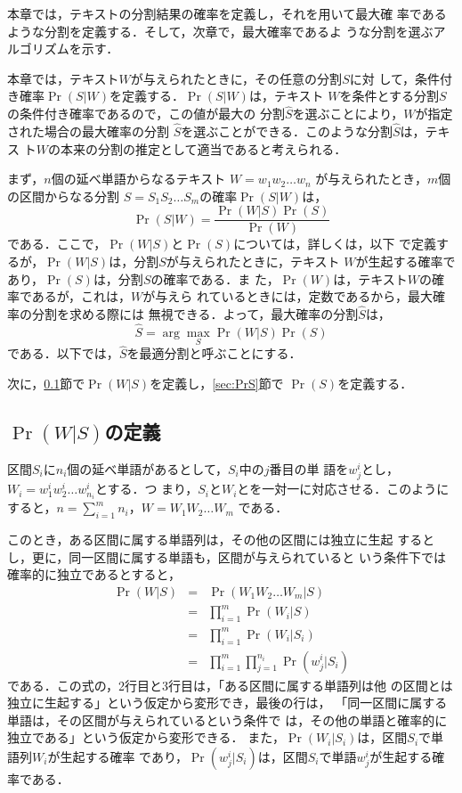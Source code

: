 本章では，テキストの分割結果の確率を定義し，それを用いて最大確
率であるような分割を定義する．そして，次章で，最大確率であるよ
うな分割を選ぶアルゴリズムを示す．

本章では，テキスト$W$が与えられたときに，その任意の分割$S$に対
して，条件付き確率$\Pr(S|W)$を定義する．$\Pr(S|W)$は，テキスト
$W$を条件とする分割$S$の条件付き確率であるので，この値が最大の
分割$\hat{S}$を選ぶことにより，$W$が指定された場合の最大確率の分割
$\hat{S}$を選ぶことができる．このような分割$\hat{S}$は，テキス
ト$W$の本来の分割の推定として適当であると考えられる．

まず，$n$個の延べ単語からなるテキスト $W = w_1 w_2 \ldots w_n$
が与えられたとき，$m$個の区間からなる分割 $S = S_1 S_2 \ldots
S_m$の確率$\Pr(S|W)$は，
\begin{equation}
  \label{eq:PrSW}
  \Pr(S|W) = \frac{\Pr(W|S) \Pr(S)}{\Pr(W)}
\end{equation}
である．ここで，$\Pr(W|S)$と$\Pr(S)$については，詳しくは，以下
で定義するが，$\Pr(W|S)$は，分割$S$が与えられたときに，テキスト
$W$が生起する確率であり，$\Pr(S)$は，分割$S$の確率である．ま
た，$\Pr(W)$は，テキスト$W$の確率であるが，これは，$W$が与えら
れているときには，定数であるから，最大確率の分割を求める際には
無視できる．よって，最大確率の分割$\hat{S}$は，
\begin{equation}
  \label{eq:hatS}
  \hat{S} = \arg \max_S \Pr(W|S) \Pr(S)
\end{equation}
である．以下では，$\hat{S}$を最適分割と呼ぶことにする．

次に，\ref{sec:PrWS}節で$\Pr(W|S)$を定義し，\ref{sec:PrS}節で
$\Pr(S)$を定義する．

\vspace{3pt}

\subsection{$\Pr(W|S)$の定義}
\label{sec:PrWS}

区間$S_i$に$n_i$個の延べ単語があるとして，$S_i$中の$j$番目の単
語を$w^i_j$とし，$W_i = w^i_1 w^i_2 \ldots w^i_{n_i}$とする．つ
まり，$S_i$と$W_i$とを一対一に対応させる．このようにすると，$n
= \sum_{i=1}^m n_i$，$W = W_1 W_2 \dots W_m$ である．

このとき，ある区間に属する単語列は，その他の区間には独立に生起
するとし，更に，同一区間に属する単語も，区間が与えられていると
いう条件下では確率的に独立であるとすると，
\begin{eqnarray}
  \label{eq:PrWSexpand}
  \Pr(W|S) & = & \Pr(W_1 W_2 \ldots W_m | S) \nonumber \\
  & = & \prod_{i=1}^m \Pr(W_i | S) \nonumber \\
  & = & \prod_{i=1}^m \Pr(W_i | S_i) \nonumber \\
  & = & \prod_{i=1}^m \prod_{j=1}^{n_i} \Pr(w^i_j|S_i)
\end{eqnarray}
である．この式の，2行目と3行目は，「ある区間に属する単語列は他
の区間とは独立に生起する」という仮定から変形でき，最後の行は，
「同一区間に属する単語は，その区間が与えられているという条件で
は，その他の単語と確率的に独立である」という仮定から変形できる．
また，$\Pr(W_i | S_i)$は，区間$S_i$で単語列$W_i$が生起する確率
であり，$\Pr(w^i_j|S_i)$は，区間$S_i$で単語$w^i_j$が生起する確
率である．


